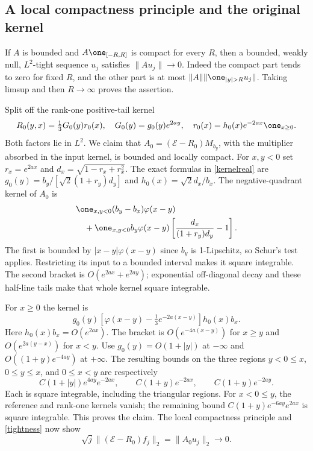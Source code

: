 \subsection{A local compactness principle and the original kernel}
If $A$ is bounded and $A\one_{[-R,R]}$ is compact for every $R$,
then a bounded, weakly null, $L^2$-tight sequence $u_j$ satisfies
$\|Au_j\|\to0$. Indeed the compact part tends to zero for fixed
$R$, and the other part is at most $\|A\|\|\one_{|y|>R}u_j\|$.
Taking limsup and then $R\to\infty$ proves the assertion.

Split off the rank-one positive-tail kernel
\[
 R_0(y,x)=\tfrac13G_0(y)r_0(x),\quad
 G_0(y)=g_0(y)e^{2ay},\quad
 r_0(x)=h_0(x)e^{-2ax}\one_{x\ge0}.
\]
Both factors lie in $L^2$. We claim that
$A_0=(\mathcal E-R_0)M_{b_y}$, with the multiplier absorbed in
the input kernel, is bounded and locally compact.
For $x,y<0$ set $r_x=e^{2ax}$ and $d_x=\sqrt{1-r_x+r_x^2}$.
The exact formulas in \eqref{kernelreal} are
$g_0(y)=b_y/[\sqrt2(1+r_y)d_y]$ and
$h_0(x)=\sqrt2d_x/b_x$. The negative-quadrant kernel of $A_0$ is
\begin{align*}
 &\one_{x,y<0}(b_y-b_x)\varphi(x-y)\\
 &\quad+\one_{x,y<0}b_y\varphi(x-y)
                  \left[\frac{d_x}{(1+r_y)d_y}-1\right].
\end{align*}
The first is bounded by $|x-y|\varphi(x-y)$ since $b_y$ is
1-Lipschitz, so Schur's test applies. Restricting its input to a
bounded interval makes it square integrable. The second bracket is
$O(e^{2ax}+e^{2ay})$; exponential off-diagonal decay and these half-line
tails make that whole kernel square integrable.

For $x\ge0$ the kernel is
\[
 g_0(y)\left[\varphi(x-y)-\tfrac13e^{-2a(x-y)}\right]h_0(x)b_x.
\]
Here $h_0(x)b_x=O(e^{2ax})$. The bracket is $O(e^{-4a(x-y)})$
for $x\ge y$ and $O(e^{2a(y-x)})$ for $x<y$.
Use $g_0(y)=O(1+|y|)$ at $-\infty$ and
$O((1+y)e^{-4ay})$ at $+\infty$. The resulting bounds on the three
regions $y<0\le x$, $0\le y\le x$, and $0\le x<y$ are respectively
\[
 C(1+|y|)e^{4ay}e^{-2ax},\qquad
 C(1+y)e^{-2ax},\qquad C(1+y)e^{-2ay}.
\]
Each is square integrable, including the triangular regions.
For $x<0\le y$, the reference and rank-one kernels vanish;
the remaining bound $C(1+y)e^{-6ay}e^{2ax}$ is square integrable.
This proves the claim. The local compactness principle and
\eqref{tightness} now show
\begin{equation}\label{minusRrate}
 \sqrt j\|(\mathcal E-R_0)f_j\|_2=\|A_0u_j\|_2\longrightarrow0.
\end{equation}

